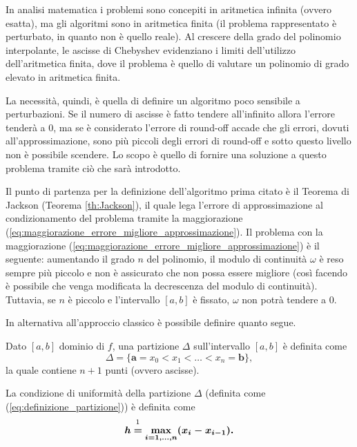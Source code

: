 In analisi matematica i problemi sono concepiti in aritmetica infinita (ovvero esatta),  ma gli algoritmi sono in aritmetica finita (il problema rappresentato è perturbato, in quanto non è quello reale). Al crescere della grado del polinomio interpolante, le ascisse di Chebyshev evidenziano i limiti dell'utilizzo dell'aritmetica finita, dove il problema è quello di valutare un polinomio di grado elevato in aritmetica finita.

La necessità, quindi, è quella di definire un algoritmo poco sensibile a perturbazioni. Se il numero di ascisse è fatto tendere all'infinito allora l'errore tenderà a 0, ma se è considerato l'errore di round-off accade che gli errori, dovuti all'approssimazione, sono più piccoli degli errori di round-off e sotto questo livello non è possibile scendere. Lo scopo è quello di fornire una soluzione a questo problema tramite ciò che sarà introdotto.

Il punto di partenza per la definizione dell'algoritmo prima citato è il Teorema di Jackson (Teorema \ref{th:Jackson}), il quale lega l'errore di approssimazione al condizionamento del problema tramite la maggiorazione (\ref{eq:maggiorazione_errore_migliore_approssimazione}). Il problema con la maggiorazione (\ref{eq:maggiorazione_errore_migliore_approssimazione}) è il seguente: aumentando il grado $n$ del polinomio, il modulo di continuità $\omega$ è reso sempre più piccolo e non è assicurato che non possa essere migliore (così facendo è possibile che venga modificata la decrescenza del modulo di continuità). Tuttavia, se $n$ è piccolo e l'intervallo $[a,b]$ è fissato, $\omega$ non potrà tendere a 0.

In alternativa all'approccio classico è possibile definire quanto segue.

\begin{definition}
    Dato $[a,b]$ dominio di $f$, una partizione $\Delta$ sull'intervallo $[a,b]$ è definita come
    \begin{equation}\label{eq:definizione_partizione}
            \Delta = \{\boldsymbol{a}=x_0<x_1<\hdots<x_n=\boldsymbol{b}\},
    \end{equation}
    la quale contiene $n+1$ punti (ovvero ascisse).
\end{definition}

\begin{definition}
    La condizione di uniformità della partizione $\Delta$ (definita come (\ref{eq:definizione_partizione})) è definita come
    \begin{equation}\label{eq:condUnifPart}
        \boldsymbol h\overset{\footnotemark}{\boldsymbol =}\underset{\boldsymbol{i=1,\hdots,n}}{\boldsymbol\max}\boldsymbol{(x_i-x_{i-1}).}
    \end{equation}
\end{definition}

